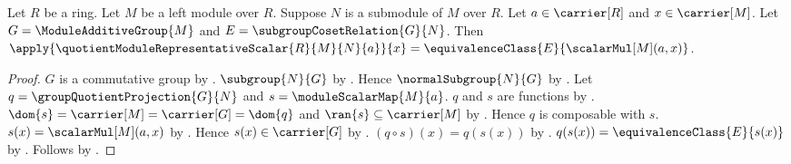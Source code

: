 \begin{proposition}\label{quotient_module_representative_scalar_apply}
    Let $R$ be a ring.
    Let $M$ be a left module over $R$.
    Suppose $N$ is a submodule of $M$ over $R$.
    Let $a\in\carrier[R]$ and $x\in\carrier[M]$.
    Let $G=\ModuleAdditiveGroup{M}$ and
        $E=\subgroupCosetRelation{G}{N}$.
    Then
        $\apply{\quotientModuleRepresentativeScalar{R}{M}{N}{a}}{x}
            =\equivalenceClass{E}{\scalarMul[M](a,x)}$.
\end{proposition}
\begin{proof}
    $G$ is a commutative group by
        .
    $\subgroup{N}{G}$ by .
    Hence $\normalSubgroup{N}{G}$ by
        .
    Let $q=\groupQuotientProjection{G}{N}$ and
        $s=\moduleScalarMap{M}{a}$.
    $q$ and $s$ are functions by
        .
    $\dom{s}=\carrier[M]=\carrier[G]=\dom{q}$ and
        $\ran{s}\subseteq\carrier[M]$ by
        .
    Hence $q$ is composable with $s$.
    $s(x)=\scalarMul[M](a,x)$ by .
    Hence $s(x)\in\carrier[G]$ by
        .
    $(q\circ s)(x)=q(s(x))$ by .
    $q(s(x))=\equivalenceClass{E}{s(x)}$ by
        .
    Follows by .
\end{proof}

